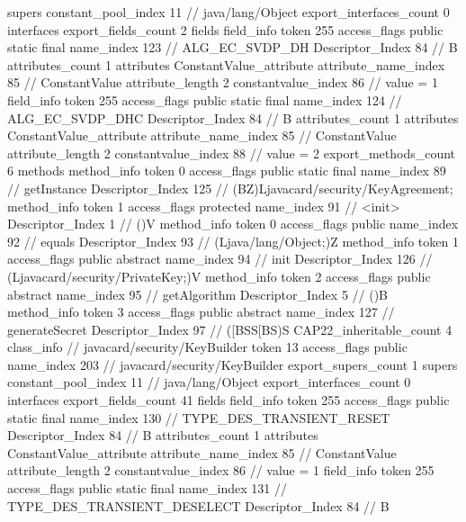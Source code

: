 {{{			supers {
				constant_pool_index	11		// java/lang/Object
			}
			export_interfaces_count	0
			interfaces {
			}
			export_fields_count	2
			fields {
			field_info {
				token	255
				access_flags	public static final
				name_index	123		// ALG_EC_SVDP_DH
				Descriptor_Index	84		// B
				attributes_count	1
				attributes {
				ConstantValue_attribute {
					attribute_name_index	85		// ConstantValue
					attribute_length	2
					constantvalue_index	86		// value = 1
				}
				}
			}
			field_info {
				token	255
				access_flags	public static final
				name_index	124		// ALG_EC_SVDP_DHC
				Descriptor_Index	84		// B
				attributes_count	1
				attributes {
				ConstantValue_attribute {
					attribute_name_index	85		// ConstantValue
					attribute_length	2
					constantvalue_index	88		// value = 2
				}
				}
			}
			}
			export_methods_count	6
			methods {
				method_info {
					token	0
					access_flags	public static final
					name_index	89		// getInstance
					Descriptor_Index	125		// (BZ)Ljavacard/security/KeyAgreement;
				}
				method_info {
					token	1
					access_flags	protected
					name_index	91		// <init>
					Descriptor_Index	1		// ()V
				}
				method_info {
					token	0
					access_flags	public
					name_index	92		// equals
					Descriptor_Index	93		// (Ljava/lang/Object;)Z
				}
				method_info {
					token	1
					access_flags	public abstract
					name_index	94		// init
					Descriptor_Index	126		// (Ljavacard/security/PrivateKey;)V
				}
				method_info {
					token	2
					access_flags	public abstract
					name_index	95		// getAlgorithm
					Descriptor_Index	5		// ()B
				}
				method_info {
					token	3
					access_flags	public abstract
					name_index	127		// generateSecret
					Descriptor_Index	97		// ([BSS[BS)S
				}
			}
			CAP22_inheritable_count	4
		}
		class_info {		// javacard/security/KeyBuilder
			token	13
			access_flags	public
			name_index	203		// javacard/security/KeyBuilder
			export_supers_count	1
			supers {
				constant_pool_index	11		// java/lang/Object
			}
			export_interfaces_count	0
			interfaces {
			}
			export_fields_count	41
			fields {
			field_info {
				token	255
				access_flags	public static final
				name_index	130		// TYPE_DES_TRANSIENT_RESET
				Descriptor_Index	84		// B
				attributes_count	1
				attributes {
				ConstantValue_attribute {
					attribute_name_index	85		// ConstantValue
					attribute_length	2
					constantvalue_index	86		// value = 1
				}
				}
			}
			field_info {
				token	255
				access_flags	public static final
				name_index	131		// TYPE_DES_TRANSIENT_DESELECT
				Descriptor_Index	84		// B
}}}}}
